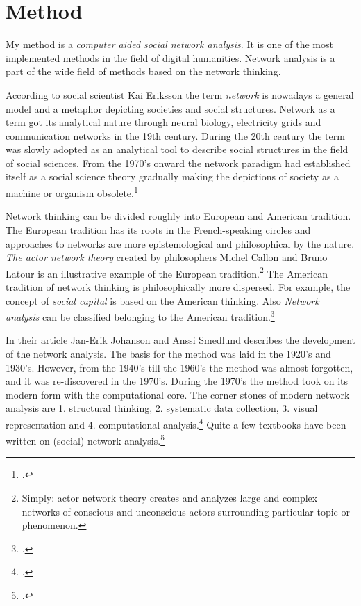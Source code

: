 \section{Method}
\label{method}
My method is a \textit{computer aided social network analysis}. It is one of the most implemented methods in the field of digital humanities. Network analysis is a part of the wide field of methods based on the network thinking.

According to social scientist Kai Eriksson the term \textit{network} is nowadays a general model and a metaphor depicting societies and social structures. Network as a term got its analytical nature through neural biology, electricity grids and communication networks in the 19th century. During the 20th century the term was slowly adopted as an analytical tool to describe social structures in the field of social sciences. From the 1970's onward the network paradigm had established itself as a social science theory gradually making the depictions of society as a machine or organism obsolete.\footcite[pp. 7-19.]{eriksson15}
 
Network thinking can be divided roughly into European and American tradition. The European tradition has its roots in the French-speaking circles and approaches to networks are more epistemological and philosophical by the nature. \textit{The actor network theory} created by philosophers Michel Callon and Bruno Latour is an illustrative example of the European tradition.\footnote{Simply: actor network theory creates and analyzes large and complex networks of conscious and unconscious actors surrounding particular topic or phenomenon.} The American tradition of network thinking is philosophically more dispersed. For example, the concept of \textit{social capital} is based on the American thinking. Also \textit{Network analysis} can be classified belonging to the American tradition.\footcite[pp. 22-24.]{eriksson15}

In their article Jan-Erik Johanson and Anssi Smedlund describes the development of the network analysis. The basis for the method was laid in the 1920's and 1930's. However, from the 1940's till the 1960's the method was almost forgotten, and it was re-discovered in the 1970's. During the 1970's the method took on its modern form with the computational core. The corner stones of modern network analysis are 1. structural thinking, 2. systematic data collection, 3. visual representation and 4. computational analysis.\footcite[pp. 236-242.]{johansonAndSmedlund15} Quite a few textbooks have been written on (social) network analysis.\footcites[See e. g. ][or Krishna Raj P. M., Ankith Mohan and K. G. Srinivasa \textit{Practical Social Network Analysis with Python} or Xiaoming Fu et al. \textit{Social Network Analysis: Interdisciplinary Approaches and Case Studies}.]{huhtamakiEtAl}

